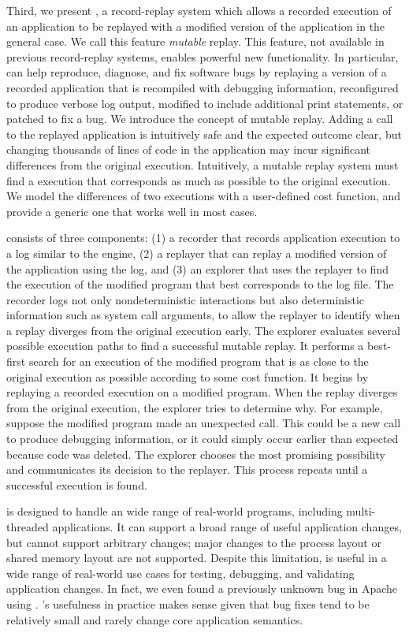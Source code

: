 Third, we present \dora, a record-replay system which
allows a recorded execution of an application to be replayed with a modified
version of the application in the general case. We call this feature {\em mutable}
replay.  This feature, not available in previous
record-replay systems, enables powerful new functionality. In particular, \dora
can help reproduce, diagnose, and fix software bugs by replaying a version of a
recorded application that is recompiled with debugging information, reconfigured
to produce verbose log output, modified to include additional print statements,
or patched to fix a bug.
We introduce the concept of mutable replay. Adding a  call
to the replayed application is intuitively safe and the expected outcome clear,
but changing thousands of lines of code in the application may incur significant
differences from the original execution. Intuitively, a mutable replay system
must find a execution that corresponds as much as possible to the original
execution. We model the differences of two executions with a user-defined cost
function, and provide a generic one that works well in most cases.

\dora consists of three components: (1) a recorder that records application
execution to a log similar to the \scribe engine, (2) a replayer that can replay
a modified version of the application using the log, and (3) an explorer that
uses the replayer to find the execution of the modified program that best
corresponds to the log file. The recorder logs not only nondeterministic
interactions but also deterministic information such as system call arguments,
to allow the replayer to identify when a replay diverges from the original
execution early.
The explorer evaluates several possible execution paths to find a successful
mutable replay. It performs a best-first search for an execution of
the modified program that is as close to the original execution as
possible according to some cost function. It begins by replaying a
recorded execution on a modified program. When the replay diverges
from the original execution, the explorer tries to determine
why. For example, suppose the modified program made an unexpected
 call. This could be a new call to produce debugging
information, or it could simply occur earlier than expected because
code was deleted. The explorer chooses the most promising possibility
and communicates its decision to the replayer. This process repeats
until a successful execution is found.

{\dora} is designed to handle an wide range of real-world programs, including
multi-threaded applications. It can support a broad range of useful application
changes, but cannot support arbitrary changes; major changes to the process
layout or shared memory layout are not supported. Despite this limitation,
{\dora} is useful in a wide range of real-world use cases for testing,
debugging, and validating application changes. In fact, we even found a
previously unknown bug in Apache using {\dora}. {\dora}'s usefulness in practice
makes sense given that bug fixes tend to be relatively small and rarely change
core application semantics.

